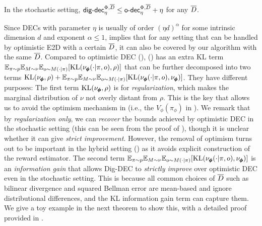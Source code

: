 \begin{theorem}\label{thm: improvement}
    In the stochastic setting, $\mathsf{dig}\text{-}\mathsf{dec}_\eta^{\Phi,\overline{D}}\leq \mathsf{o}\text{-}\mathsf{dec}_\eta^{\Phi,\overline{D}} + \eta$ for any $\overline{D}$.  
\end{theorem}
Since DECs with parameter $\eta$ is usually of order $(\eta d)^\alpha$ for some intrinsic dimension $d$ and exponent $\alpha\leq 1$,  implies that for any setting that can be handled by optimistic E2D with a certain $\overline{D}$, it can also be covered by our algorithm with the same $\overline{D}$. Compared to optimistic DEC (), \decname () has an extra KL term $\mathbb{E}_{\pi\sim p}\mathbb{E}_{M\sim \nu}\mathbb{E}_{o\sim M(\cdot|\pi)}[\text{KL}(\nu_{\pmb{\phi}}(\cdot|\pi,o), \rho)]$ that can be further decomposed into two terms $\text{KL}(\nu_{\pmb{\phi}}, \rho) + \mathbb{E}_{\pi\sim p}\mathbb{E}_{M\sim \nu}\mathbb{E}_{o\sim M(\cdot|\pi)}[\text{KL}(\nu_{\pmb{\phi}}(\cdot|\pi,o), \nu_{\pmb{\phi}})]$. They have different purposes: The first term $\text{KL}(\nu_{\pmb{\phi}}, \rho)$ is for \emph{regularization}, which makes the marginal distribution of $\nu$ not overly distant from $\rho$. This is the key that allows us to avoid the optimism mechanism in \cite{foster2024model} (i.e., the $V_\phi(\pi_\phi)$ in ). We remark that by \emph{regularization only}, we can \emph{recover} the bounds achieved by optimistic DEC in the stochastic setting (this can be seen from the proof of ), though it is unclear whether it can give \emph{strict improvement}. However, the removal of optimism turns out to be important in the hybrid setting () as it avoids explicit construction of the reward estimator. The second term $\mathbb{E}_{\pi\sim p}\mathbb{E}_{M\sim \nu}\mathbb{E}_{o\sim M(\cdot|\pi)}[\text{KL}(\nu_{\pmb{\phi}}(\cdot|\pi,o), \nu_{\pmb{\phi}})]$ is an \emph{information gain} that allows Dig-DEC to \emph{strictly improve} over optimistic DEC even in the stochastic setting. This is because all common choices of $\overline{D}$ such as bilinear divergence and squared Bellman error are mean-based and ignore distributional differences, and the KL information gain term can capture them. 
We give a toy example in the next theorem to show this, with a detailed proof provided in .  
